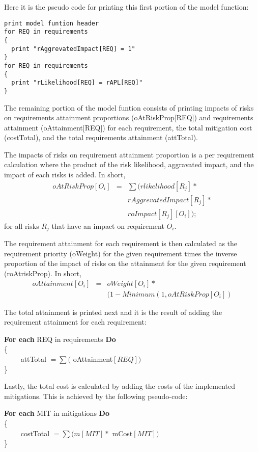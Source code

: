 Here it is the pseudo code for printing this first portion of the
model function:
 
\begin{footnotesize}
\begin{verbatim}
print model funtion header
for REQ in requirements
{
  print "rAggrevatedImpact[REQ] = 1"
}
for REQ in requirements
{
  print "rLikelihood[REQ] = rAPL[REQ]"
}
\end{verbatim}
\end{footnotesize}

The remaining portion of the model funtion consists of printing impacts of
risks on requirements attainment proportions (oAtRiskProp[REQ]) and
requirements attainment (oAttainment[REQ]) for each requirement,
the total mitigation cost (costTotal), and the total
requirements attainment (attTotal). 

The impacts of risks on requirement attainment proportion is a per 
requirement calculation where
the product of the risk likelihood, aggravated impact, and the impact
of each risks is added. In short,
\begin{eqnarray*}
oAtRiskProp[O_i]&=&\sum(rlikelihood[R_j] * \\
& &rAggrevatedImpact[R_j] * \\
& &roImpact[R_j][O_i]);
\end{eqnarray*}
for all risks $R_j$ that
have an impact on requirement $O_i$.

The requirement attainment for each requirement is then calculated as the
requirement priority (oWeight) for the given requirement times the inverse proportion
of the impact of risks on the attainment for the given requirement (roAtriskProp).
In short,
\begin{eqnarray*}
oAttainment[O_i]&=&oWeight[O_i]*\\
& &(1-Minimum(1, oAtRiskProp[O_i])
\end{eqnarray*}

The total attainment is printed next and it is the result of adding the requirement
attainment for each requirement:

\begin{footnotesize}
\bi
\item[]
\textbf{For each} REQ in requirements \textbf{Do} \\
\{ \\
\mbox{\ \ \ \ } attTotal $=\sum($ oAttainment$[REQ])$ \\
\}
\ei
\end{footnotesize}

Lastly, the total cost is calculated by adding the costs of the implemented
mitigations. This is achieved by the following pseudo-code:

\begin{footnotesize}
\bi
\item[]
\textbf{For each} MIT in mitigations \textbf{Do} \\
\{ \\
\mbox{\ \ \ \ } costTotal $=\sum(m[MIT] *$ mCost$[MIT])$ \\
\}
\ei
\end{footnotesize}

